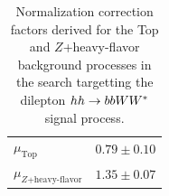 \begin{table}[!htb]
    \begin{center}
        \caption{
            Normalization correction factors derived for the Top and $Z$+heavy-flavor background
            processes in the search targetting the dilepton $hh \rightarrow bbWW^*$ signal process.
        }
        \label{tab:hh_norm_factors}
        \begin{tabular}{l | c}
        \hline
        \hline
            $\mu_{\text{Top}}$ & $0.79 \pm 0.10$ \\
            $\mu_{Z\text{+heavy-flavor}}$ & $1.35 \pm 0.07$ \\
        \hline
        \hline
        \end{tabular}
    \end{center}
\end{table}
